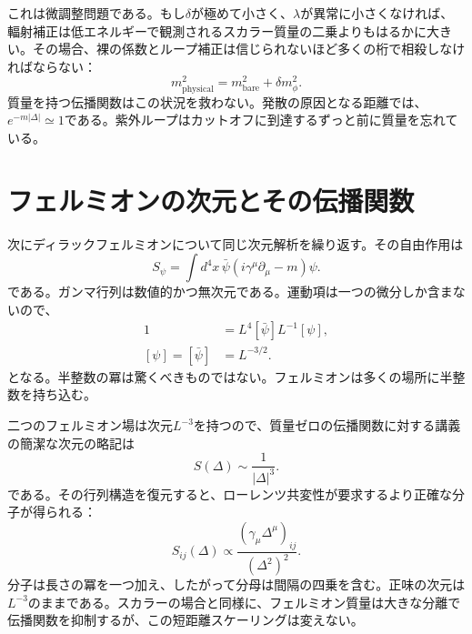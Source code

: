 これは微調整問題である。もし\(\delta\)が極めて小さく、\(\lambda\)が異常に小さくなければ、輻射補正は低エネルギーで観測されるスカラー質量の二乗よりもはるかに大きい。その場合、裸の係数とループ補正は信じられないほど多くの桁で相殺しなければならない：
\begin{equation}
m_{\mathrm{physical}}^2
=m_{\mathrm{bare}}^2+\delta m_\phi^2.
\end{equation}
質量を持つ伝播関数はこの状況を救わない。発散の原因となる距離では、\(e^{-m|\Delta|}\simeq1\)である。紫外ループはカットオフに到達するずっと前に質量を忘れている。

\section{フェルミオンの次元とその伝播関数}

次にディラックフェルミオンについて同じ次元解析を繰り返す。その自由作用は
\begin{equation}
S_\psi=\int d^4x\,
\bar\psi\left(i\gamma^\mu\partial_\mu-m\right)\psi.
\end{equation}
である。ガンマ行列は数値的かつ無次元である。運動項は一つの微分しか含まないので、
\begin{align}
1
&=L^4[\bar\psi]L^{-1}[\psi],\\
[\psi]=[\bar\psi]&=L^{-3/2}.
\end{align}
となる。半整数の冪は驚くべきものではない。フェルミオンは多くの場所に半整数を持ち込む。

\begin{classroomqa}
\end{classroomqa}

二つのフェルミオン場は次元\(L^{-3}\)を持つので、質量ゼロの伝播関数に対する講義の簡潔な次元の略記は
\begin{equation}
S(\Delta)\sim\frac{1}{|\Delta|^3}.
\end{equation}
である。その行列構造を復元すると、ローレンツ共変性が要求するより正確な分子が得られる：
\begin{equation}
S_{ij}(\Delta)
\propto
\frac{\left(\gamma_\mu\Delta^\mu\right)_{ij}}
{\left(\Delta^2\right)^2}.
\end{equation}
分子は長さの冪を一つ加え、したがって分母は間隔の四乗を含む。正味の次元は\(L^{-3}\)のままである。スカラーの場合と同様に、フェルミオン質量は大きな分離で伝播関数を抑制するが、この短距離スケーリングは変えない。


